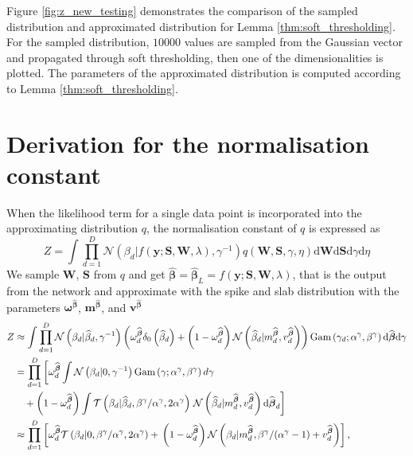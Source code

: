 \documentclass{article}
\begin{document}
Figure \ref{fig:z_new_testing} demonstrates the comparison of the sampled distribution and approximated distribution for Lemma \ref{thm:soft_thresholding}. For the sampled distribution, $10000$ values are sampled from the Gaussian vector and propagated through soft thresholding, then one of the dimensionalities is plotted. The parameters of the approximated distribution is computed according to Lemma \ref{thm:soft_thresholding}.

\section{Derivation for the normalisation constant}
When the likelihood term for a single data point is incorporated into the approximating distribution $q$, the normalisation constant of $q$ is expressed as
\begin{equation}
\label{eq:Z}
Z = \int \prod_{d=1}^{D} \mathcal{N}(\beta_d | f(\mathbf{y} ; \mathbf{S}, \mathbf{W}, \lambda), \gamma^{-1}) q(\mathbf{W}, \mathbf{S}, \gamma, \eta) \mathrm{d}\mathbf{W} \mathrm{d}\mathbf{S} \mathrm{d}\gamma \mathrm{d}\eta
\end{equation}
We sample $\mathbf{W}$, $\mathbf{S}$ from $q$ and get $\widehat{\boldsymbol\beta} = \widehat{\boldsymbol\beta}_L = f(\mathbf{y} ; \mathbf{S}, \mathbf{W}, \lambda)$, that is the output from the network and approximate with the spike and slab distribution with the parameters $\boldsymbol\omega^{\widehat{\boldsymbol\beta}}$, $\mathbf{m}^{\widehat{\boldsymbol\beta}}$, and $\mathbf{v}^{\widehat{\boldsymbol\beta}}$
\begin{align}
Z &\approx \int \prod_{d=1}^{D} \mathcal{N}\left(\beta_d | \widehat{\beta}_d, \gamma^{-1}\right) \left(\omega^{\widehat{\boldsymbol\beta}}_d \delta_0\left(\widehat{\beta}_d\right) + \left(1 - \omega^{\widehat{\boldsymbol\beta}}_d\right)\mathcal{N}\left(\widehat{\beta}_d | m^{\widehat{\boldsymbol\beta}}_d, v^{\widehat{\boldsymbol\beta}}_d\right)\right) \text{Gam} \left(\gamma_d; \alpha^\gamma, \beta^\gamma\right)\mathrm{d}\widehat{\boldsymbol\beta} \mathrm{d}\gamma  \nonumber\\
& = \prod_{d=1}^{D} \left[\omega^{\widehat{\boldsymbol\beta}}_d \int \mathcal{N}\left(\beta_d | 0, \gamma^{-1}\right)  \text{Gam} \left(\gamma; \alpha^\gamma, \beta^\gamma\right) d\gamma  \nonumber \right.\\
&\quad + \left(1 - \omega^{\widehat{\boldsymbol\beta}}_d\right)\int \mathcal{T}\left(\beta_d | \widehat{\beta}_d, \beta^\gamma / \alpha^\gamma, 2\alpha^\gamma\right) 
\left. \vphantom{\int}  \mathcal{N}\left(\widehat{\beta}_d | m^{\widehat{\boldsymbol\beta}}_d, v^{\widehat{\boldsymbol\beta}}_d\right) \mathrm{d}\widehat{\boldsymbol\beta}_d\right]  \nonumber\\
\label{eq:Z_approx}
& \approx \prod_{d=1}^D \left[\omega^{\widehat{\boldsymbol\beta}}_d  \mathcal{T}\left(\beta_d | 0, \beta^\gamma / \alpha^\gamma, 2\alpha^\gamma\right) + \vphantom{m^{\widehat{\boldsymbol\beta}}_d} \left(1 - \omega^{\widehat{\boldsymbol\beta}}_d\right)\mathcal{N}\left(\beta_d | m^{\widehat{\boldsymbol\beta}}_d,  \beta^\gamma / (\alpha^\gamma - 1) + v^{\widehat{\boldsymbol\beta}}_d\right)\right],
\end{align}
\end{document}
